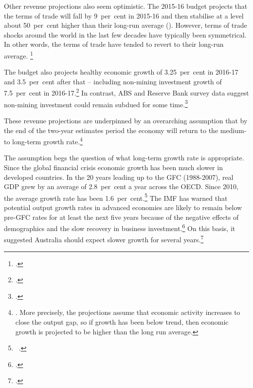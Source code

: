 \documentclass[twoside,english]{palatinob5ona4portrait}
\begin{document}
Other revenue projections also seem optimistic. The 2015-16 budget projects that the terms of trade will fall by 9~per~cent in 2015-16 and then stabilise at a level about 50~per~cent higher than their long-run average (). However, terms of trade shocks around the world in the last few decades have typically been symmetrical. In other words, the terms of trade have tended to revert to their long-run average. \footcite[][34--35]{MinifieCherastidthamMullerworthEtAl2013} 


The budget also projects healthy economic growth of 3.25~per~cent in 2016-17 and 3.5~per~cent after that – including non-mining investment growth of 7.5~per~cent in 2016-17.\footcites[][1--7]{Treasury2015BudgetPapers201516}  In contrast, ABS and Reserve Bank survey data suggest non-mining investment could remain subdued for some time.\footcite[][38--44]{RBA2015a}  

These revenue projections are underpinned by an overarching assumption that by the end of the two-year estimates period the economy will return to the medium- to long-term growth rate.\footnote{\textcite{Treasury2014h}.  More precisely, the projections assume that economic activity increases to close the output gap, so if growth has been below trend, then economic growth is projected to be higher than the long run average.}

The assumption begs the question of what long-term growth rate is appropriate. Since the global financial crisis economic growth has been much slower in developed countries. In the 20 years leading up to the GFC (1988-2007), real GDP grew by an average of 2.8~per~cent a year across the OECD\@. Since 2010, the average growth rate has been 1.6~per~cent.\footnote{\gao\ \textcite{OECD2015a}.}  The IMF has warned that potential output growth rates in advanced economies are likely to remain below pre-GFC rates for at least the next five years because of the negative effects of demographics and the slow recovery in business investment.\footcite[][Chapter~3]{IMF2015b}  On this basis, it suggested Australia should expect slower growth for several years.\footcite{IMF2015} 
\end{document}
